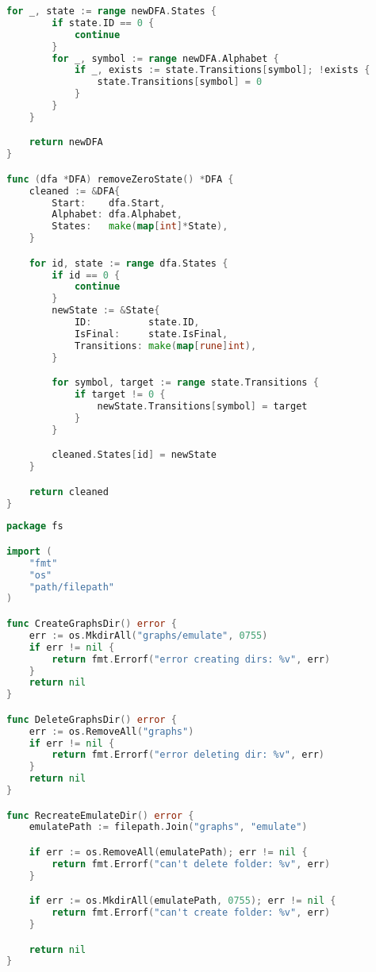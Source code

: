 \begin{lstlisting}[language=Go, caption={Код модуля \textit{dfa}}]
	for _, state := range newDFA.States {
		if state.ID == 0 {
			continue
		}
		for _, symbol := range newDFA.Alphabet {
			if _, exists := state.Transitions[symbol]; !exists {
				state.Transitions[symbol] = 0
			}
		}
	}

	return newDFA
}

func (dfa *DFA) removeZeroState() *DFA {
	cleaned := &DFA{
		Start:    dfa.Start,
		Alphabet: dfa.Alphabet,
		States:   make(map[int]*State),
	}

	for id, state := range dfa.States {
		if id == 0 {
			continue
		}
		newState := &State{
			ID:          state.ID,
			IsFinal:     state.IsFinal,
			Transitions: make(map[rune]int),
		}

		for symbol, target := range state.Transitions {
			if target != 0 {
				newState.Transitions[symbol] = target
			}
		}

		cleaned.States[id] = newState
	}

	return cleaned
}
\end{lstlisting}

\begin{lstlisting}[language=Go, caption={Код модуля \textit{fs}}]
package fs

import (
	"fmt"
	"os"
	"path/filepath"
)

func CreateGraphsDir() error {
	err := os.MkdirAll("graphs/emulate", 0755)
	if err != nil {
		return fmt.Errorf("error creating dirs: %v", err)
	}
	return nil
}

func DeleteGraphsDir() error {
	err := os.RemoveAll("graphs")
	if err != nil {
		return fmt.Errorf("error deleting dir: %v", err)
	}
	return nil
}

func RecreateEmulateDir() error {
	emulatePath := filepath.Join("graphs", "emulate")

	if err := os.RemoveAll(emulatePath); err != nil {
		return fmt.Errorf("can't delete folder: %v", err)
	}

	if err := os.MkdirAll(emulatePath, 0755); err != nil {
		return fmt.Errorf("can't create folder: %v", err)
	}

	return nil
}
\end{lstlisting}

